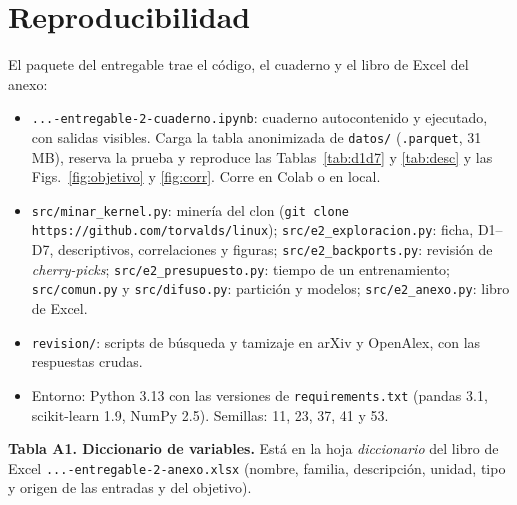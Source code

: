 \section{Reproducibilidad}
\label{ap:repro}
El paquete del entregable trae el código, el cuaderno y el libro de Excel del anexo:
\begin{itemize}
\item \texttt{...-entregable-2-cuaderno.ipynb}: cuaderno autocontenido y ejecutado, con salidas visibles. Carga la tabla anonimizada de \texttt{datos/} (\texttt{.parquet}, 31 MB), reserva la prueba y reproduce las Tablas~\ref{tab:d1d7} y \ref{tab:desc} y las Figs.~\ref{fig:objetivo} y \ref{fig:corr}. Corre en Colab o en local.
\item \texttt{src/minar\_kernel.py}: minería del clon (\texttt{git clone https://github.com/torvalds/linux}); \texttt{src/e2\_exploracion.py}: ficha, D1--D7, descriptivos, correlaciones y figuras; \texttt{src/e2\_backports.py}: revisión de \emph{cherry-picks}; \texttt{src/e2\_presupuesto.py}: tiempo de un entrenamiento; \texttt{src/comun.py} y \texttt{src/difuso.py}: partición y modelos; \texttt{src/e2\_anexo.py}: libro de Excel.
\item \texttt{revision/}: scripts de búsqueda y tamizaje en arXiv y OpenAlex, con las respuestas crudas.
\item Entorno: Python 3.13 con las versiones de \texttt{requirements.txt} (pandas 3.1, scikit-learn 1.9, NumPy 2.5). Semillas: 11, 23, 37, 41 y 53.
\end{itemize}

\textbf{Tabla A1. Diccionario de variables.} Está en la hoja \emph{diccionario} del libro de Excel \texttt{...-entregable-2-anexo.xlsx} (nombre, familia, descripción, unidad, tipo y origen de las \cifNVariables{} entradas y del objetivo).
